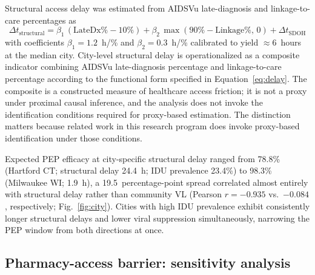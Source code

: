 \documentclass[10pt,letterpaper]{article}
\theoremstyle{definition}
\theoremstyle{remark}
\begin{document}
Structural access delay was estimated from AIDSVu late-diagnosis and linkage-to-care percentages as
\begin{equation}
\Delta t_{\text{structural}} = \beta_{1}\,(\text{LateDx}\% - 10\%) + \beta_{2}\,\max(90\% - \text{Linkage}\%,\, 0) + \Delta t_{\text{SDOH}}
\label{eq:delay}
\end{equation}
with coefficients $\beta_{1} = 1.2$~h/\% and $\beta_{2} = 0.3$~h/\% calibrated to yield $\approx$6~hours at the median city. City-level structural delay is operationalized as a composite indicator combining AIDSVu late-diagnosis percentage and linkage-to-care percentage according to the functional form specified in Equation~\ref{eq:delay}. The composite is a constructed measure of healthcare access friction; it is not a proxy under proximal causal inference\cite{tchetgentchetgen2020}, and the analysis does not invoke the identification conditions required for proxy-based estimation\cite{pearl2009}. The distinction matters because related work in this research program does invoke proxy-based identification under those conditions.

Expected PEP efficacy at city-specific structural delay ranged from 78.8\% (Hartford CT; structural delay 24.4~h; IDU prevalence 23.4\%) to 98.3\% (Milwaukee WI; 1.9~h), a 19.5~percentage-point spread correlated almost entirely with structural delay rather than community VL (Pearson $r = -0.935$ vs.\ $-0.084$, respectively; Fig.~\ref{fig:city}). Cities with high IDU prevalence exhibit consistently longer structural delays and lower viral suppression simultaneously, narrowing the PEP window from both directions at once.

\subsection*{Pharmacy-access barrier: sensitivity analysis}
\end{document}
